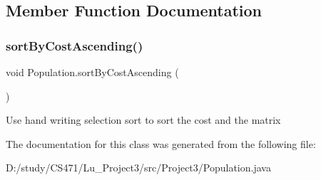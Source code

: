 \subsection{Member Function Documentation}
\mbox{\label{class_population_a5bde451618cde8c6b3ea08dc87846a53}} 
\subsubsection{\texorpdfstring{sortByCostAscending()}{sortByCostAscending()}}
{\footnotesize\ttfamily void Population.\+sort\+By\+Cost\+Ascending (\begin{DoxyParamCaption}{ }\end{DoxyParamCaption})}

Use hand writing selection sort to sort the cost and the matrix 

The documentation for this class was generated from the following file\+:\begin{DoxyCompactItemize}
\item 
D\+:/study/\+C\+S471/\+Lu\+\_\+\+Project3/src/\+Project3/Population.\+java\end{DoxyCompactItemize}
